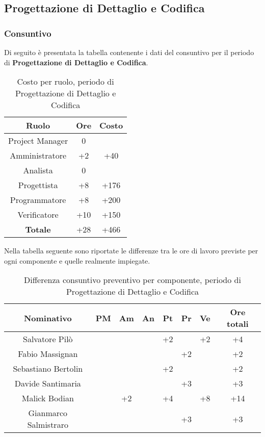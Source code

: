 \subsection{Progettazione di Dettaglio e Codifica}
		\subsubsection{Consuntivo}
		Di seguito è presentata la tabella contenente i dati del consuntivo per il periodo di \textbf{Progettazione di Dettaglio e Codifica}.
	\begin{table}[H]
		\centering
		\begin{tabular}{|c|c|c|}
			\hline
			\textbf{Ruolo}		& \textbf{Ore}	& \textbf{Costo} \\
			\hline
			Project Manager		& 0			&	\\
			Amministratore		& +2		& +40	\\
			Analista			& 0			&  \\
			Progettista			& +8		& +176	\\
			Programmatore		& +8		& +200	\\
			Verificatore		& +10		& +150	\\
			\hline
			\textbf{Totale}		& +28		& +466	\\
			\hline
		\end{tabular}
		\caption{Costo per ruolo, periodo di Progettazione di Dettaglio e Codifica}
	\end{table}
	Nella tabella seguente sono riportate le differenze tra le ore di lavoro previste per ogni componente e quelle realmente impiegate.
	\begin{table}[H]
		\centering
		\begin{tabular}{|c|c|c|c|c|c|c|c|}
			\hline
			\textbf{Nominativo}		& \textbf{PM}	& \textbf{Am}	& \textbf{An}	& \textbf{Pt}	& \textbf{Pr}	& \textbf{Ve}	& \textbf{Ore totali}     \\
			\hline
			Salvatore Pilò			& 		& 		& 		& +2	&		& +2	& +4 \\
			Fabio Massignan			& 		& 		&		&		& +2	& 		& +2 \\
			Sebastiano Bertolin		&		& 	 	& 		& +2	& 		&		& +2 \\
			Davide Santimaria		&		& 		&		&		& +3	& 		& +3 \\
			Malick Bodian			& 		& +2	& 		& +4	&		& +8	& +14 \\
			Gianmarco Salmistraro	&		&		& 	 	&		& +3	& 		& +3 \\
			\hline
		\end{tabular}
		\caption{Differenza consuntivo preventivo per componente, periodo di Progettazione di Dettaglio e Codifica}
	\end{table}
